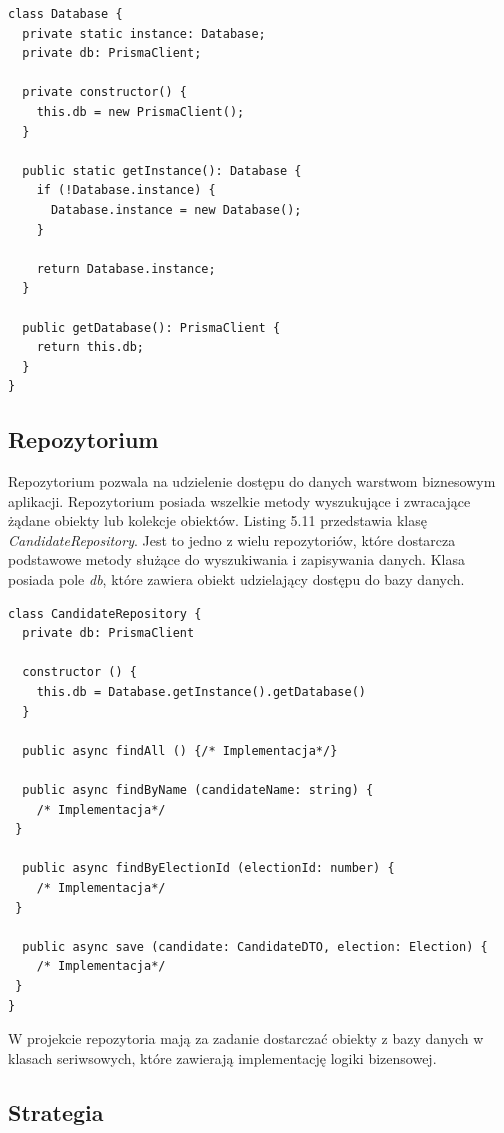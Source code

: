 \documentclass[a4paper,12pt]{book}
\begin{document}
\begin{lstlisting}[style=ES6, caption={Klasa \textit{Database}. Singleton.}]
class Database {
  private static instance: Database;
  private db: PrismaClient;

  private constructor() {
    this.db = new PrismaClient();
  }

  public static getInstance(): Database {
    if (!Database.instance) {
      Database.instance = new Database();
    }

    return Database.instance;
  }

  public getDatabase(): PrismaClient {
    return this.db;
  }
}
\end{lstlisting}

\subsection{Repozytorium}

Repozytorium pozwala na udzielenie dostępu do danych warstwom biznesowym aplikacji. Repozytorium posiada wszelkie metody wyszukujące i zwracające żądane obiekty lub kolekcje obiektów. Listing 5.11 przedstawia klasę \textit{CandidateRepository}. Jest to jedno z wielu repozytoriów, które dostarcza podstawowe metody służące do wyszukiwania i zapisywania danych. Klasa posiada pole \textit{db}, które zawiera obiekt udzielający dostępu do bazy danych.

\begin{lstlisting}[style=ES6, caption={Klasa \textit{CandidateRepository}.}]
class CandidateRepository {
  private db: PrismaClient

  constructor () {
    this.db = Database.getInstance().getDatabase()
  }

  public async findAll () {/* Implementacja*/}

  public async findByName (candidateName: string) {
	/* Implementacja*/
 }

  public async findByElectionId (electionId: number) {
	/* Implementacja*/
 }

  public async save (candidate: CandidateDTO, election: Election) {
	/* Implementacja*/
 }
}
\end{lstlisting}

W projekcie repozytoria mają za zadanie dostarczać obiekty z bazy danych w klasach seriwsowych, które zawierają implementację logiki bizensowej.

\subsection{Strategia}
\end{document}
